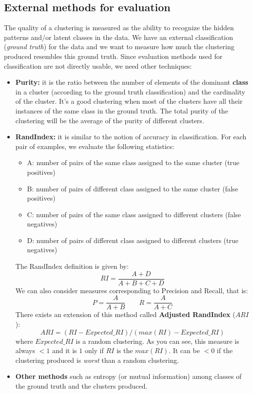 \subsection{External methods for evaluation}
The quality of a clustering is measured as the ability to recognize the hidden patterns and/or latent classes in the data. We have an external classification (\textit{ground truth}) for the data and we want to measure how much the clustering produced resembles this ground truth. Since evaluation methods used for classification are not directly usable, we need other techniques:
\begin{itemize}
    \item \textbf{Purity:} it is the ratio between the number of elements of the dominant \textbf{class} in a cluster (according to the ground truth classification) and the cardinality of the cluster. It's a good clustering when most of the clusters have all their instances of the same class in the ground truth. The total purity of the clustering will be the average of the purity of different clusters.
    \item \textbf{RandIndex:} it is similar to the notion of accuracy in classification. For each pair of examples, we evaluate the following statistics:
    \begin{itemize}
        \item A: number of pairs of the same class assigned to the same cluster (true positives)
        \item B: number of pairs of different class assigned to the same cluster (false positives)
        \item C: number of pairs of the same class assigned to different clusters (false negatives)
        \item D: number of pairs of different class assigned to different clusters (true negatives)
    \end{itemize}
    The RandIndex definition is given by:
    \[RI = \frac{A + D}{A + B + C + D}\]
    We can also consider measures corresponding to Precision and Recall, that is:
    \[P = \frac{A}{A+B} \quad \quad R = \frac{A}{A + C}\]
    There exists an extension of this method called \textbf{Adjusted RandIndex} ($ARI$):
    \[ARI = (RI - Expected\_RI) / (max(RI) - Expected\_RI)\]
    where $Expected\_RI$ is a random clustering. As you can see, this measure is always $< 1$ and it is $1$ only if $RI$ is the $max(RI)$. It can be $< 0$ if the clustering produced is \textit{worst} than a random clustering.
    \item \textbf{Other methods} such as entropy (or mutual information) among classes of the ground truth and the clusters produced.
\end{itemize}
